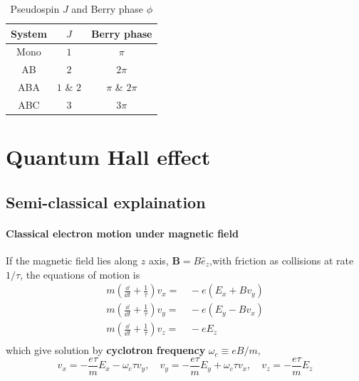 \documentclass[12pt,a4paper]{article}
\begin{document}
    \begin{table}[H]
        \centering
        \begin{tabular}{*{3}{c}}
            \toprule
            System  & $J$           & Berry phase       \\
            \midrule
            Mono    & $1$           & $\pi$             \\
            AB      & $2$           & $2\pi$            \\
            ABA     & $1$ \& $2$    & $\pi$ \& $2\pi$   \\
            ABC     & $3$           & $3\pi$            \\
            \bottomrule
        \end{tabular}
    \caption{Pseudospin $J$ and Berry phase $\phi$}
    \label{table_J}
    \end{table}


\section{Quantum Hall effect}

\subsection{Semi-classical explaination}

\paragraph{Classical electron motion under magnetic field}

    \begin{lem}
        If the magnetic field lies along $z$ axis, $\mathbf{B}=B\hat{e}_z$,with friction as collisions at rate $1/\tau$, the equations of motion is
        \begin{equation}
        \begin{aligned}
            m \left(\frac{\dd}{\dd t} + \frac{1}{\tau}\right) v_x = &\, -e (E_x+Bv_y) \\
            m \left(\frac{\dd}{\dd t} + \frac{1}{\tau}\right) v_y = &\, -e (E_y-Bv_x) \\
            m \left(\frac{\dd}{\dd t} + \frac{1}{\tau}\right) v_z = &\, -e E_z \\
        \end{aligned}
        \label{eq:5_1_10_v_EB}
        \end{equation}
        which give solution by \textbf{cyclotron frequency} $\omega_c\equiv eB/m$,
        \begin{equation}
            v_x = - \frac{e\tau}{m} E_x - \omega_c \tau v_y, \quad
            v_y = - \frac{e\tau}{m} E_y + \omega_c \tau v_x, \quad
            v_z = - \frac{e\tau}{m} E_z
        \label{eq:5_1_11_v_EB}
        \end{equation}
    \end{lem}
\end{document}

